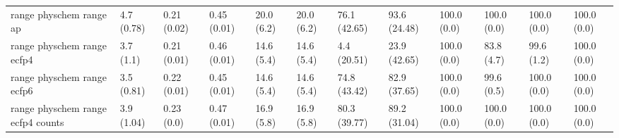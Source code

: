 \begin{tabular}{llllllllllll}
range physchem range ap & {\cellcolor[HTML]{F0F9FB}} \color[HTML]{000000} 4.7 (0.78) & {\cellcolor[HTML]{F2FAFC}} \color[HTML]{000000} 0.21 (0.02) & {\cellcolor[HTML]{74C8AE}} \color[HTML]{000000} 0.45 (0.01) & {\cellcolor[HTML]{ECF8FB}} \color[HTML]{000000} 20.0 (6.2) & {\cellcolor[HTML]{ECF8FB}} \color[HTML]{000000} 20.0 (6.2) & {\cellcolor[HTML]{208843}} \color[HTML]{F1F1F1} 76.1 (42.65) & {\cellcolor[HTML]{005924}} \color[HTML]{F1F1F1} 93.6 (24.48) & {\cellcolor[HTML]{00441B}} \color[HTML]{F1F1F1} 100.0 (0.0) & {\cellcolor[HTML]{00441B}} \color[HTML]{F1F1F1} 100.0 (0.0) & {\cellcolor[HTML]{00441B}} \color[HTML]{F1F1F1} 100.0 (0.0) & {\cellcolor[HTML]{00441B}} \color[HTML]{F1F1F1} 100.0 (0.0) \\
range physchem range ecfp4 & {\cellcolor[HTML]{F2FAFC}} \color[HTML]{000000} 3.7 (1.1) & {\cellcolor[HTML]{F7FCFD}} \color[HTML]{000000} 0.21 (0.01) & {\cellcolor[HTML]{74C8AE}} \color[HTML]{000000} 0.46 (0.01) & {\cellcolor[HTML]{F7FCFD}} \color[HTML]{000000} 14.6 (5.4) & {\cellcolor[HTML]{F7FCFD}} \color[HTML]{000000} 14.6 (5.4) & {\cellcolor[HTML]{F1FAFC}} \color[HTML]{000000} 4.4 (20.51) & {\cellcolor[HTML]{CEEDE8}} \color[HTML]{000000} 23.9 (42.65) & {\cellcolor[HTML]{00441B}} \color[HTML]{F1F1F1} 100.0 (0.0) & {\cellcolor[HTML]{00441B}} \color[HTML]{F1F1F1} 83.8 (4.7) & {\cellcolor[HTML]{00441B}} \color[HTML]{F1F1F1} 99.6 (1.2) & {\cellcolor[HTML]{00441B}} \color[HTML]{F1F1F1} 100.0 (0.0) \\
range physchem range ecfp6 & {\cellcolor[HTML]{F2FAFC}} \color[HTML]{000000} 3.5 (0.81) & {\cellcolor[HTML]{F5FBFD}} \color[HTML]{000000} 0.22 (0.01) & {\cellcolor[HTML]{75C9AF}} \color[HTML]{000000} 0.45 (0.01) & {\cellcolor[HTML]{ECF8FB}} \color[HTML]{000000} 14.6 (5.4) & {\cellcolor[HTML]{ECF8FB}} \color[HTML]{000000} 14.6 (5.4) & {\cellcolor[HTML]{238B45}} \color[HTML]{F1F1F1} 74.8 (43.42) & {\cellcolor[HTML]{0C7735}} \color[HTML]{F1F1F1} 82.9 (37.65) & {\cellcolor[HTML]{00441B}} \color[HTML]{F1F1F1} 100.0 (0.0) & {\cellcolor[HTML]{00441B}} \color[HTML]{F1F1F1} 99.6 (0.5) & {\cellcolor[HTML]{00441B}} \color[HTML]{F1F1F1} 100.0 (0.0) & {\cellcolor[HTML]{00441B}} \color[HTML]{F1F1F1} 100.0 (0.0) \\
range physchem range ecfp4 counts & {\cellcolor[HTML]{F2FAFC}} \color[HTML]{000000} 3.9 (1.04) & {\cellcolor[HTML]{F7FCFD}} \color[HTML]{000000} 0.23 (0.0) & {\cellcolor[HTML]{70C6AC}} \color[HTML]{000000} 0.47 (0.01) & {\cellcolor[HTML]{F7FCFD}} \color[HTML]{000000} 16.9 (5.8) & {\cellcolor[HTML]{F7FCFD}} \color[HTML]{000000} 16.9 (5.8) & {\cellcolor[HTML]{147E3A}} \color[HTML]{F1F1F1} 80.3 (39.77) & {\cellcolor[HTML]{006729}} \color[HTML]{F1F1F1} 89.2 (31.04) & {\cellcolor[HTML]{00441B}} \color[HTML]{F1F1F1} 100.0 (0.0) & {\cellcolor[HTML]{00441B}} \color[HTML]{F1F1F1} 100.0 (0.0) & {\cellcolor[HTML]{00441B}} \color[HTML]{F1F1F1} 100.0 (0.0) & {\cellcolor[HTML]{00441B}} \color[HTML]{F1F1F1} 100.0 (0.0) \\

\end{tabular}
